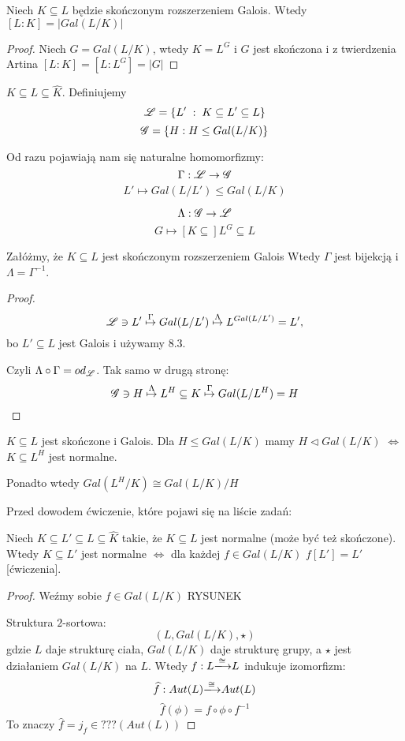 \begin{conclusion}
Niech $K\subseteq L$ będzie skończonym rozszerzeniem Galois. Wtedy $[L:K]=|Gal(L/K)|$
\end{conclusion}

\begin{proof}
Niech $G=Gal(L/K)$, wtedy $K=L^G$ i $G$ jest skończona i z twierdzenia Artina $[L:K]=[L:L^G]=|G|$
\end{proof}

\begin{bbox}
$K\subseteq L\subseteq\hat{K}$. Definiujemy
$$\mathcal{L}=\{L'\;:\;K\subseteq L'\subseteq L\}$$
$$\mathcal{G}=\{H:H\leq Gal(L/K)\}$$
\end{bbox}

Od razu pojawiają nam się naturalne homomorfizmy:
$$\Gamma:\mathcal{L}\to\mathcal{G}$$
$$L'\mapsto Gal(L/L')\leq Gal(L/K)$$

$$\Lambda:\mathcal{G}\to\mathcal{L}$$
$$G\mapsto [K\subseteq]L^{G}\subseteq L$$

\begin{theorem}
Załóżmy, że $K\subseteq L$ jest skończonym rozszerzeniem Galois Wtedy $\Gamma$ jest bijekcją i $\Lambda=\Gamma^{-1}$. 
\end{theorem}

\begin{proof}
$$\mathcal{L}\ni L'\overset{\Gamma}{\mapsto}Gal(L/L')\overset{\Lambda}{\mapsto}L^{Gal(L/L')}=L',$$
bo $L'\subseteq L$ jest Galois i używamy 8.3.

Czyli $\Lambda\circ\Gamma=od_{\mathcal{L}}$. Tak samo w drugą stronę:
$$\mathcal{G}\ni H\overset{\Lambda}{\mapsto}L^H\subseteq K\overset{\Gamma}{\mapsto}Gal(L/L^H)=H$$
\end{proof}

\setcounter{theorem}{8}

\begin{conclusion}
$K\subseteq L$ jest skończone i Galois. Dla $H\leq Gal(L/K)$ mamy $H\triangleleft Gal(L/K)$ $\iff$ $K\subseteq L^H$ jest normalne.

Ponadto wtedy $Gal(L^H/K)\cong Gal(L/K)/H$
\end{conclusion}

Przed dowodem ćwiczenie, które pojawi się na liście zadań:

Niech $K\subseteq L'\subseteq L\subseteq\hat{K}$ takie, że $K\subseteq L$ jest normalne (może być też skończone). Wtedy $K\subseteq L'$ jest normalne $\iff$ dla każdej $f\in Gal(L/K)$ $f[L']=L'$ [ćwiczenia].

\begin{proof}
Weźmy sobie $f\in Gal(L/K)$
{\large\color{orange}RYSUNEK}

Struktura $2$-sortowa:
$$(L, Gal(L/K),\star)$$
gdzie $L$ daje strukturę ciała, $Gal(L/K)$ daje strukturę grupy, a $\star$ jest działaniem $Gal(L/K)$ na $L$. Wtedy $f:L\isomorphism L$ indukuje izomorfizm:
$$\hat{f}:Aut(L)\isomorphism Aut(L)$$
$$\hat{f}(\phi)=f\circ\phi\circ f^{-1}$$
To znaczy $\hat{f}=j_f\in ???(Aut(L))$
\end{proof}
